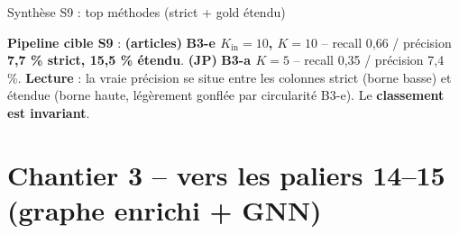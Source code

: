 \documentclass[aspectratio=169,10pt]{beamer}
\newcommand{\crossbox}[1]{%
  \begin{center}
  \colorbox{violet!10}{\parbox{0.92\linewidth}{\centering #1}}
  \end{center}}
\begin{document}
\begin{frame}{Synthèse S9 : top méthodes (strict + gold étendu)}
  \vspace{0.3em}
  \crossbox{\textbf{Pipeline cible S9} :
  \textbf{(articles)} \textcolor{accent}{\textbf{B3-e $K_{\text{in}}{=}10$, $K{=}10$}}
  -- recall 0,66 / précision \textbf{7,7 \% strict, 15,5 \% étendu}.
  \textbf{(JP)} \textcolor{accent}{\textbf{B3-a $K{=}5$}} -- recall 0,35 / précision 7,4 \%.
  \textbf{Lecture} : la vraie précision se situe entre les colonnes strict (borne basse) et étendue
  (borne haute, légèrement gonflée par circularité B3-e). Le \textbf{classement est invariant}.}
\end{frame}

\section{Chantier 3 -- vers les paliers 14--15 (graphe enrichi + GNN)}
\end{document}
